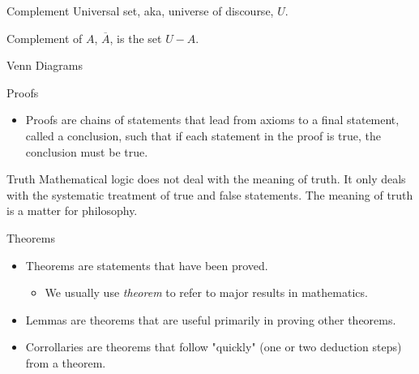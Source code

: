 \documentclass[smaller]{beamer}
\begin{document}
\begin{frame}[label={sec:org5de9439}]{Complement}
Universal set, aka, universe of discourse, \(U\).

Complement of \(A\), \(\overline{A}\), is the set \(U - A\).
\end{frame}

\begin{frame}[label={sec:orgcd860c6}]{Venn Diagrams}
\end{frame}


\begin{frame}[label={sec:org7c6d325}]{Proofs}
\begin{itemize}
\item Proofs are chains of statements that lead from axioms to a final statement, called a conclusion, such that if each statement in the proof is true, the conclusion must be true.
\end{itemize}

\begin{alertblock}{Truth}
Mathematical logic does not deal with the meaning of truth.  It only deals with the systematic treatment of true and false statements.  The meaning of truth is a matter for philosophy.
\end{alertblock}
\end{frame}

\begin{frame}[label={sec:org968359c}]{Theorems}
\begin{itemize}
\item Theorems are statements that have been proved.
\begin{itemize}
\item We usually use \emph{theorem} to refer to major results in mathematics.
\end{itemize}
\item Lemmas are theorems that are useful primarily in proving other theorems.
\item Corrollaries are theorems that follow "quickly" (one or two deduction steps) from a theorem.
\end{itemize}
\end{frame}
\end{document}
